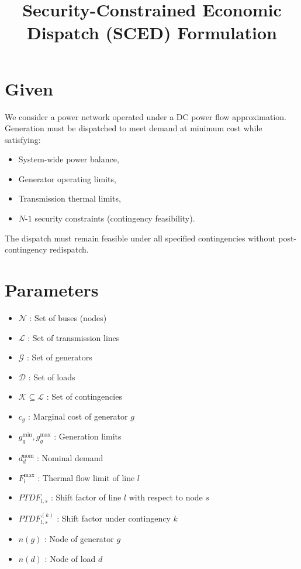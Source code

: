 \documentclass[11pt]{article}
\title{Security-Constrained Economic Dispatch (SCED) Formulation}
\author{}
\date{}
\begin{document}
\maketitle

\section*{Given}

We consider a power network operated under a DC power flow approximation.
Generation must be dispatched to meet demand at minimum cost while satisfying:

\begin{itemize}[noitemsep]
    \item System-wide power balance,
    \item Generator operating limits,
    \item Transmission thermal limits,
    \item $N$-$1$ security constraints (contingency feasibility).
\end{itemize}

The dispatch must remain feasible under all specified contingencies without post-contingency redispatch.

\section*{Parameters}

\begin{itemize}[noitemsep]
    \item $\mathcal{N}$ : Set of buses (nodes)
    \item $\mathcal{L}$ : Set of transmission lines
    \item $\mathcal{G}$ : Set of generators
    \item $\mathcal{D}$ : Set of loads
    \item $\mathcal{K} \subseteq \mathcal{L}$ : Set of contingencies
    \item $c_g$ : Marginal cost of generator $g$
    \item $g_g^{\min}, g_g^{\max}$ : Generation limits
    \item $d_d^{\text{nom}}$ : Nominal demand
    \item $F_l^{\max}$ : Thermal flow limit of line $l$
    \item $PTDF_{l,s}$ : Shift factor of line $l$ with respect to node $s$
    \item $PTDF_{l,s}^{(k)}$ : Shift factor under contingency $k$
    \item $n(g)$ : Node of generator $g$
    \item $n(d)$ : Node of load $d$
\end{itemize}
\end{document}
